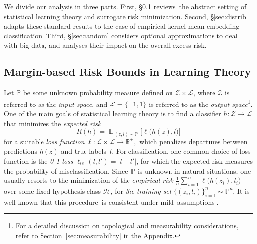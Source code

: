\documentclass{article}
\DeclareMathOperator*{\E}{\mathbb{E}\,}
\renewcommand{\H}{\mathcal{H}}
\newcommand{\Z}{\mathcal{Z}}
\newcommand{\Pio}{\mathbb{P}}
\newcommand{\R}{\mathbb{R}}
\renewcommand{\L}{\mathcal{L}}
\begin{document}
We divide our analysis in three parts.  First, \S\ref{sec:classic} reviews~the
abstract setting of statistical learning theory and surrogate risk
minimization.  Second, \S\ref{sec:distrib} adapts these standard results to the
case of empirical kernel mean embedding classification.  Third,
\S\ref{sec:random} considers optional approximations to deal with big data,
and analyses their impact on the overall excess risk.

\subsection{Margin-based Risk Bounds in Learning Theory}
\label{sec:classic}
Let $\Pio$ be some unknown probability measure defined on $\Z \times \L$, where
$\Z$ is referred to as the \emph{input space}, and $\L = \{-1,1\}$ is referred
to as the \emph{output space}\footnote{For a detailed discussion on topological
and measurability considerations, refer to Section~\ref{sec:measurability} in
the Appendix.}.  One of the main goals of statistical learning theory
\cite{Vap98} is to find a classifier $h\colon \Z\to\L$ that minimizes the
\emph{expected risk}
\begin{equation*}
  R(h) = \E_{(z,l)\sim \Pio}\bigl[\ell\bigl(h(z),l\bigr)\bigr]
\end{equation*}
for a suitable \emph{loss function} $\ell\colon\L \times \L\to\R^+$,~which 
  penalizes departures between predictions $h(z)$ and true labels~$l$.
  For classification, one common choice of loss function is the \emph{0-1 loss}
  $\ell_{01}(l,l')=|l-l'|$, for which the expected risk measures the
  probability of misclassification.  Since~$\Pio$ is unknown in natural
  situations, one usually resorts to the minimization of the \emph{empirical
  risk} $\frac{1}{n}\sum_{i=1}^n\ell\bigl(h(z_i),l_i\bigr)$ over some fixed
  hypothesis class $\H$, for \emph{the training set} $\{(z_i,l_i)\}_{i=1}^n
  \sim \Pio^n$.  It is well known that this procedure~is consistent under mild~assumptions \cite{BBL05}.
\end{document}
